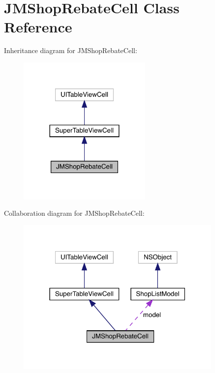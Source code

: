 \hypertarget{interface_j_m_shop_rebate_cell}{}\section{J\+M\+Shop\+Rebate\+Cell Class Reference}
\label{interface_j_m_shop_rebate_cell}


Inheritance diagram for J\+M\+Shop\+Rebate\+Cell\+:\nopagebreak
\begin{figure}[H]
\begin{center}
\leavevmode
\includegraphics[width=185pt]{interface_j_m_shop_rebate_cell__inherit__graph}
\end{center}
\end{figure}


Collaboration diagram for J\+M\+Shop\+Rebate\+Cell\+:\nopagebreak
\begin{figure}[H]
\begin{center}
\leavevmode
\includegraphics[width=286pt]{interface_j_m_shop_rebate_cell__coll__graph}
\end{center}
\end{figure}
